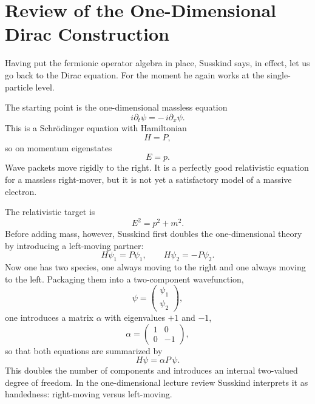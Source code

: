 \section{Review of the One-Dimensional Dirac Construction}

Having put the fermionic operator algebra in place, Susskind says, in effect, let us go back to the Dirac equation. For the moment he again works at the single-particle level.

The starting point is the one-dimensional massless equation
\begin{equation}
i\partial_t\psi=-\,i\partial_x\psi.
\end{equation}
This is a Schr\"odinger equation with Hamiltonian
\begin{equation}
H=P,
\end{equation}
so on momentum eigenstates
\begin{equation}
E=p.
\end{equation}
Wave packets move rigidly to the right. It is a perfectly good relativistic equation for a massless right-mover, but it is not yet a satisfactory model of a massive electron.

The relativistic target is
\begin{equation}
E^2=p^2+m^2.
\end{equation}
Before adding mass, however, Susskind first doubles the one-dimensional theory by introducing a left-moving partner:
\begin{equation}
H\psi_1=P\psi_1,
\qquad
H\psi_2=-P\psi_2.
\end{equation}
Now one has two species, one always moving to the right and one always moving to the left. Packaging them into a two-component wavefunction,
\begin{equation}
\psi=
\begin{pmatrix}
\psi_1\\
\psi_2
\end{pmatrix},
\end{equation}
one introduces a matrix \(\alpha\) with eigenvalues \(+1\) and \(-1\),
\begin{equation}
\alpha=
\begin{pmatrix}
1&0\\
0&-1
\end{pmatrix},
\end{equation}
so that both equations are summarized by
\begin{equation}
H\psi=\alpha P\,\psi.
\end{equation}
This doubles the number of components and introduces an internal two-valued degree of freedom. In the one-dimensional lecture review Susskind interprets it as handedness: right-moving versus left-moving.

